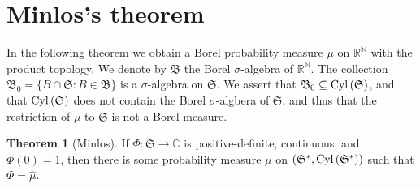 \documentclass{article}
\newcommand{\Cyl}{\ensuremath\mathrm{Cyl}\,}
\theoremstyle{definition}
\newtheorem{theorem}{Theorem}
\theoremstyle{definition}
\begin{document}
\section{Minlos's theorem}
In the following theorem we obtain a Borel probability measure $\mu$ on $\mathbb{R}^\mathbb{N}$ with the product topology. We denote
by $\mathfrak{B}$ the Borel
$\sigma$-algebra of $\mathbb{R}^\mathbb{N}$. The collection $\mathfrak{B}_0=\{B \cap \mathfrak{S}: B \in \mathfrak{B}\}$  is a $\sigma$-algebra
on $\mathfrak{S}$. We assert that $\mathfrak{B}_0 \subseteq \Cyl(\mathfrak{S})$, and that $\Cyl(\mathfrak{S})$ does not contain the Borel $\sigma$-algbera of $\mathfrak{S}$,
and thus that the restriction of $\mu$ to $\mathfrak{S}$ is not a Borel measure. 


\begin{theorem}[Minlos]
If $\Phi:\mathfrak{S} \to \mathbb{C}$ is positive-definite, continuous, and $\Phi(0)=1$, then there is some probability measure $\mu$
on $(\mathfrak{S}^*,\Cyl(\mathfrak{S}^*))$ such that $\Phi=\hat{\mu}$.
\end{theorem}
\end{document}
